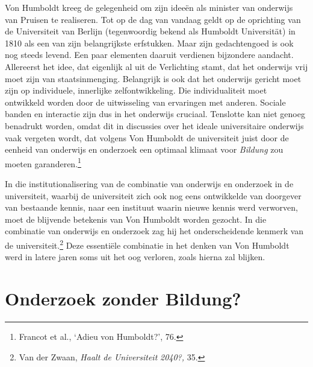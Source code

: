 \documentclass[smallauthor, chapterhaspagenum, nochapterinheader, pagenuminheader,  bigchapnum,medium2, tocpages, garamond, titleinheader]{jote-book}
\begin{document}
	Von Humboldt kreeg de gelegenheid om zijn ideeën als minister van onderwijs van Pruisen te realiseren. Tot op de dag van vandaag geldt op de oprichting van de Universiteit van Berlijn (tegenwoordig bekend als Humboldt Universität) in 1810 als een van zijn belangrijkste erfstukken. Maar zijn gedachtengoed is ook nog steeds levend. Een paar elementen daaruit verdienen bijzondere aandacht. Allereerst het idee, dat eigenlijk al uit de Verlichting stamt, dat het onderwijs vrij moet zijn van staatsinmenging. Belangrijk is ook dat het onderwijs gericht moet zijn op individuele, innerlijke zelfontwikkeling. Die individualiteit moet ontwikkeld worden door de uitwisseling van ervaringen met anderen. Sociale banden en interactie zijn dus in het onderwijs cruciaal. Tenslotte kan niet genoeg benadrukt worden, omdat dit in discussies over het ideale universitaire onderwijs vaak vergeten wordt, dat volgens Von Humboldt de universiteit juist door de eenheid van onderwijs en onderzoek een optimaal klimaat voor \emph{Bildung} zou moeten garanderen.\footnote{Francot et al., ‘Adieu von Humboldt?', 76.}



	In die institutionalisering van de combinatie van onderwijs en onderzoek in de universiteit, waarbij de universiteit zich ook nog eens ontwikkelde van doorgever van bestaande kennis, naar een instituut waarin nieuwe kennis werd verworven, moet de blijvende betekenis van Von Humboldt worden gezocht. In die combinatie van onderwijs en onderzoek zag hij het onderscheidende kenmerk van de universiteit.\footnote{Van der Zwaan, \emph{Haalt de Universiteit }\emph{2040?,} 35.} Deze essentiële combinatie in het denken van Von Humboldt werd in latere jaren soms uit het oog verloren, zoals hierna zal blijken.



	\section{Onderzoek zonder Bildung?}
\end{document}
